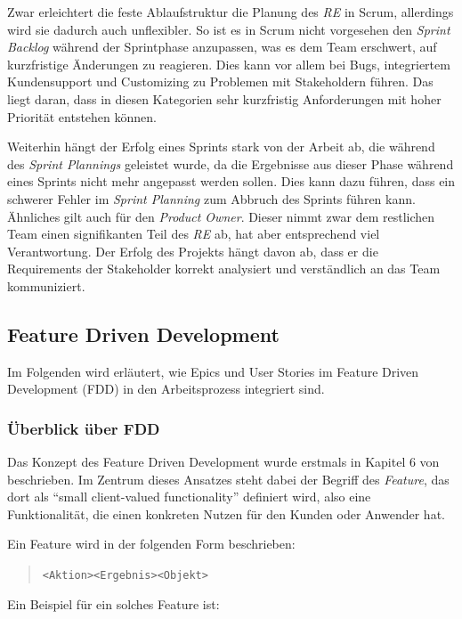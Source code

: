 \documentclass[acmtog]{acmart}
\begin{document}
Zwar erleichtert die feste Ablaufstruktur die Planung des \emph{RE} in Scrum, allerdings wird sie dadurch auch unflexibler. So ist es in Scrum nicht 
vorgesehen den \emph{Sprint Backlog} während der Sprintphase anzupassen, was es dem Team erschwert, auf kurzfristige Änderungen zu reagieren. Dies 
kann vor allem bei Bugs, integriertem Kundensupport und Customizing zu Problemen mit Stakeholdern führen. Das liegt daran, dass in 
diesen Kategorien sehr kurzfristig Anforderungen mit hoher Priorität entstehen können.

Weiterhin hängt der Erfolg eines Sprints stark von der Arbeit ab, die während des \emph{Sprint Plannings} geleistet wurde, da die Ergebnisse aus 
dieser Phase während eines Sprints nicht mehr angepasst werden sollen. Dies kann dazu führen, dass ein schwerer Fehler im \emph{Sprint Planning} zum 
Abbruch des Sprints führen kann. Ähnliches gilt auch für den \emph{Product Owner}. Dieser nimmt zwar dem restlichen Team einen signifikanten Teil 
des \emph{RE} ab, hat aber entsprechend viel Verantwortung. Der Erfolg des Projekts hängt davon ab, dass er die Requirements der Stakeholder korrekt 
analysiert und verständlich an das Team kommuniziert.

\subsection{Feature Driven Development}
Im Folgenden wird erläutert, wie Epics und User Stories im Feature Driven Development (FDD) in den Arbeitsprozess integriert sind.

\subsubsection{Überblick über FDD}
Das Konzept des Feature Driven Development wurde erstmals in Kapitel 6 von \cite{coad99} beschrieben.
Im Zentrum dieses Ansatzes steht dabei der Begriff des \emph{Feature}, das dort als ``small client-valued functionality'' definiert wird, also eine Funktionalität, die einen konkreten Nutzen für den Kunden oder Anwender hat.

Ein Feature wird in der folgenden Form beschrieben:

\begin{quote}
	\texttt{<Aktion>\hspace{5ex}<Ergebnis>\hspace{5ex}<Objekt>}
\end{quote}

Ein Beispiel für ein solches Feature ist:
\end{document}

